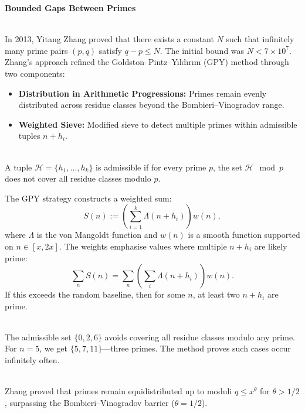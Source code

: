 \begin{technical}
{\Large\textbf{Bounded Gaps Between Primes}}

\\[0.5em]
In 2013, Yitang Zhang proved that there exists a constant \( N \) such that infinitely many prime pairs \( (p, q) \) satisfy \( q - p \leq N \). The initial bound was \( N < 7\times10^7 \). Zhang's approach refined the Goldston–Pintz–Yıldırım (GPY) method through two components:

\begin{itemize}[leftmargin=*]
    \item \textbf{Distribution in Arithmetic Progressions:} Primes remain evenly distributed across residue classes beyond the Bombieri–Vinogradov range.
    \item \textbf{Weighted Sieve:} Modified sieve to detect multiple primes within admissible tuples \( n + h_i \).
\end{itemize}

\vspace{0.7em}
\\[0.5em]
A tuple \( \mathcal{H} = \{h_1, \dots, h_k\} \) is admissible if for every prime \( p \), the set \( \mathcal{H} \mod p \) does not cover all residue classes modulo \( p \).

The GPY strategy constructs a weighted sum:
\[
S(n) := \left( \sum_{i=1}^k \Lambda(n + h_i) \right) w(n),
\]
where \( \Lambda \) is the von Mangoldt function and \( w(n) \) is a smooth function supported on \( n \in [x, 2x] \). The weights emphasise values where multiple \( n + h_i \) are likely prime:
\[
\sum_{n} S(n) = \sum_{n} \left( \sum_i \Lambda(n + h_i) \right) w(n).
\]
If this exceeds the random baseline, then for some \( n \), at least two \( n + h_i \) are prime.

\vspace{0.7em}
\\[0.5em]
The admissible set \( \{0, 2, 6\} \) avoids covering all residue classes modulo any prime. For \( n = 5 \), we get \( \{5, 7, 11\} \)—three primes. The method proves such cases occur infinitely often.

\vspace{0.7em}
\\[0.5em]
Zhang proved that primes remain equidistributed up to moduli \( q \le x^\theta \) for \( \theta > 1/2 \), surpassing the Bombieri–Vinogradov barrier (\( \theta = 1/2 \)).


\end{technical}
